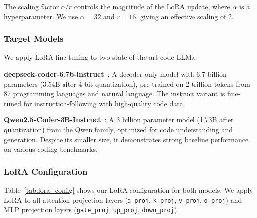\documentclass[conference]{IEEEtran}
\begin{document}
The scaling factor $\alpha/r$ controls the magnitude of the LoRA update, where $\alpha$ is a hyperparameter. We use $\alpha = 32$ and $r = 16$, giving an effective scaling of 2.

\subsubsection{Target Models}
We apply LoRA fine-tuning to two state-of-the-art code LLMs:

\textbf{deepseek-coder-6.7b-instruct}~\cite{deepseek2024}: A decoder-only model with 6.7 billion parameters (3.54B after 4-bit quantization), pre-trained on 2 trillion tokens from 87 programming languages and natural language. The instruct variant is fine-tuned for instruction-following with high-quality code data.

\textbf{Qwen2.5-Coder-3B-Instruct}~\cite{qwen2024}: A 3 billion parameter model (1.73B after quantization) from the Qwen family, optimized for code understanding and generation. Despite its smaller size, it demonstrates strong baseline performance on various coding benchmarks.

\subsubsection{LoRA Configuration}
Table~\ref{tab:lora_config} shows our LoRA configuration for both models. We apply LoRA to all attention projection layers (\texttt{q\_proj}, \texttt{k\_proj}, \texttt{v\_proj}, \texttt{o\_proj}) and MLP projection layers (\texttt{gate\_proj}, \texttt{up\_proj}, \texttt{down\_proj}).
\end{document}
